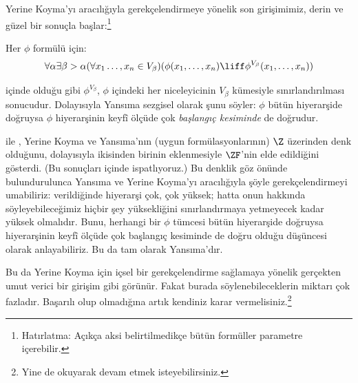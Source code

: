 


Yerine Koyma'yı \stagesinex{} aracılığıyla gerekçelendirmeye yönelik son
girişimimiz, derin ve güzel bir sonuçla başlar:\footnote{Hatırlatma: Açıkça
aksi belirtilmedikçe bütün formüller parametre içerebilir.}
\begin{thm}
Her $\phi$ formülü için:
\[
\forall \alpha \exists \beta > \alpha (\forall x_1 \ldots, x_n \in
V_\beta)(\phi(x_1, \ldots, x_n) \liff \phi^{V_\beta}(x_1, \ldots, x_n))
\]
\end{thm}
\noindent 
{} içinde olduğu gibi
$\phi^{V_\beta}$, $\phi$ içindeki her niceleyicinin $V_\beta$ kümesiyle
sınırlandırılması sonucudur. Dolayısıyla Yansıma sezgisel olarak şunu söyler:
$\phi$ bütün hiyerarşide doğruysa $\phi$ hiyerarşinin keyfî ölçüde çok
\emph{başlangıç kesiminde} de doğrudur.

\citet{Montague1961} ile \citet{Levy1960}, Yerine Koyma ve Yansıma'nın (uygun
formülasyonlarının) $\Z$ üzerinden denk olduğunu, dolayısıyla ikisinden
birinin eklenmesiyle $\ZF$'nin elde edildiğini gösterdi. (Bu sonuçları
 içinde ispatlıyoruz.) Bu denklik göz
önünde bulundurulunca Yansıma ve Yerine Koyma'yı \stagesinex{} aracılığıyla
şöyle gerekçelendirmeyi umabiliriz: \stagesinex{} verildiğinde hiyerarşi çok,
çok yüksek; hatta onun hakkında söyleyebileceğimiz hiçbir şey yüksekliğini
sınırlandırmaya yetmeyecek kadar yüksek olmalıdır. Bunu, herhangi bir
$\phi$ tümcesi bütün hiyerarşide doğruysa hiyerarşinin keyfî ölçüde çok
başlangıç kesiminde de doğru olduğu düşüncesi olarak anlayabiliriz. Bu da tam
olarak Yansıma'dır.

Bu da Yerine Koyma için içsel bir gerekçelendirme sağlamaya yönelik gerçekten
umut verici bir girişim gibi görünür. Fakat burada söylenebileceklerin miktarı
çok fazladır. Başarılı olup olmadığına artık kendiniz karar vermelisiniz.\footnote{Yine de
\citet[95--100]{Incurvati2020} okuyarak devam etmek isteyebilirsiniz.}


